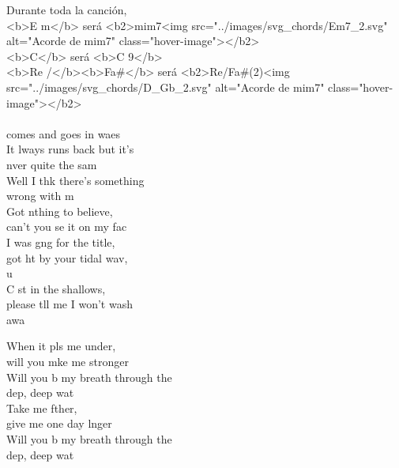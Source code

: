 \begin{cancion}%
	\jump
Durante toda la canción, \\
<b>E m</b> será <b2>mim7<img src="../images/svg_chords/Em7_2.svg" alt="Acorde de mim7" class="hover-image"></b2>\\
<b>C</b>  será <b>C 9</b>\\
<b>Re /</b><b>Fa#</b> será <b2>Re/Fa#(2)<img src="../images/svg_chords/D_Gb_2.svg" alt="Acorde de mim7" class="hover-image"></b2>\\
	\jump
	\jump
	            \\
	 comes and goes in waes\\
	It lways runs back but it's \\
	nver quite the sam \\
	Well I thk there's something \\
	wrong with m \\
	Got nthing to believe, \\
	can't you se it on my fac \\
	\jump
	I was gng for the title, \\
	got ht by your tidal wav, \\
	u \\
	C st in the shallows, \\
	please tll me I won't wash\\
	 awa   \jump\\
	\begin{chorus}%
		When it pls me under, \\
		will you mke me stronger\\
		Will you b my breath through the \\
		dep, deep wat \\
		Take me fther, \\
		give me one day lnger\\
		Will you b my breath through the \\
		dep, deep wat \\

\end{chorus}
\end{cancion}
